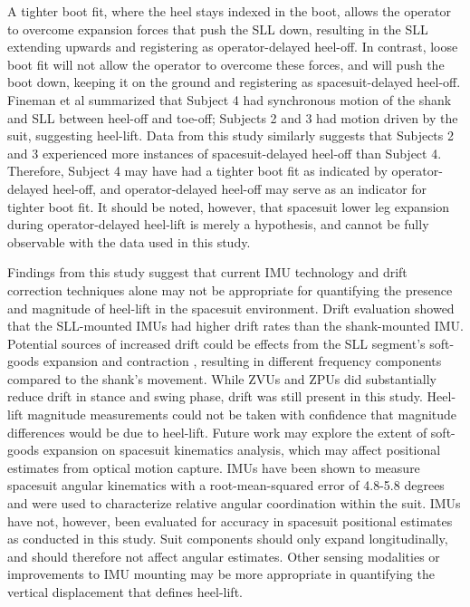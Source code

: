 \documentclass[defaultstyle,11pt]{thesis}
\begin{document}
A tighter boot fit, where the heel stays indexed in the boot, allows the operator to overcome expansion forces that push the SLL down, resulting in the SLL extending upwards and registering as operator-delayed heel-off.
In contrast, loose boot fit will not allow the operator to overcome these forces, and will push the boot down, keeping it on the ground and registering as spacesuit-delayed heel-off.
Fineman et al \citep{Fineman2018} summarized that Subject 4 had synchronous motion of the shank and SLL between heel-off and toe-off; Subjects 2 and 3 had motion driven by the suit, suggesting heel-lift.
Data from this study similarly suggests that Subjects 2 and 3 experienced more instances of spacesuit-delayed heel-off than Subject 4.
Therefore, Subject 4 may have had a tighter boot fit as indicated by operator-delayed heel-off, and operator-delayed heel-off may serve as an indicator for tighter boot fit.
It should be noted, however, that spacesuit lower leg expansion during operator-delayed heel-lift is merely a hypothesis, and cannot be fully observable with the data used in this study.

Findings from this study suggest that current IMU technology and drift correction techniques alone may not be appropriate for quantifying the presence and magnitude of heel-lift in the spacesuit environment.
Drift evaluation showed that the SLL-mounted IMUs had higher drift rates than the shank-mounted IMU.
Potential sources of increased drift could be effects from the SLL segment's soft-goods expansion and contraction \citep{Fineman2018, Harris2001}, resulting in different frequency components compared to the shank's movement.
While ZVUs and ZPUs did substantially reduce drift in stance and swing phase, drift was still present in this study.
Heel-lift magnitude measurements could not be taken with confidence that magnitude differences would be due to heel-lift.
Future work may explore the extent of soft-goods expansion on spacesuit kinematics analysis, which may affect positional estimates from optical motion capture.
IMUs have been shown to measure spacesuit angular kinematics with a root-mean-squared error of 4.8-5.8 degrees\citep{Bertrand2014} and were used to characterize relative angular coordination within the suit\citep{Fineman2018}.
IMUs have not, however, been evaluated for accuracy in spacesuit positional estimates as conducted in this study.
Suit components should only expand longitudinally, and should therefore not affect angular estimates\citep{Harris2001}.
Other sensing modalities or improvements to IMU mounting may be more appropriate in quantifying the vertical displacement that defines heel-lift.
\end{document}
